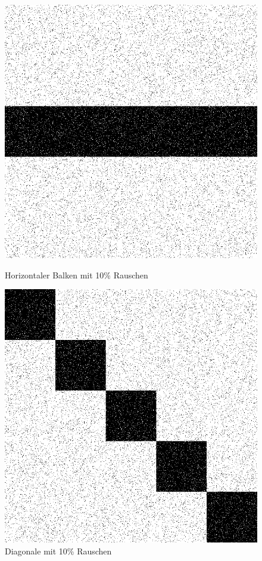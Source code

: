 \begin{figure}[hbt]
	\begin{minipage}{0.49 \textwidth}
		\includegraphics[width=\textwidth]{./Bilder/Auswertung/BeispielBilder/Picture_Line1_noise_10_pixelCnt_128_featureCnt_5}
		\caption{Horizontaler Balken mit 10\% Rauschen}
	\end{minipage}
	\hfill
	\begin{minipage}{0.49 \textwidth}
		\includegraphics[width=\textwidth]{./Bilder/Auswertung/BeispielBilder/Picture_Line2_noise_10_pixelCnt_128_featureCnt_5}
		\caption{Diagonale mit 10\% Rauschen}
	\end{minipage}
\end{figure}

